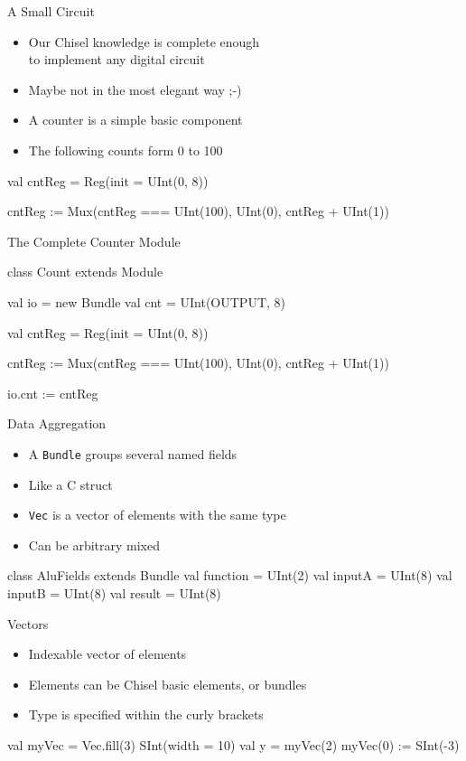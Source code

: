 \documentclass[xcolor=pdflatex,dvipsnames,table]{beamer}
\newcommand{\code}[1]{{\texttt{#1}}}
\begin{document}
\begin{frame}[fragile]{A Small Circuit}
\begin{itemize}
\item Our Chisel knowledge is complete enough\\ to implement any digital circuit
\item Maybe not in the most elegant way ;-)
\item A counter is a simple basic component
\item The following counts form 0 to 100
\end{itemize}
\begin{chisel}
  val cntReg = Reg(init = UInt(0, 8))

  cntReg := Mux(cntReg === UInt(100),
    UInt(0), cntReg + UInt(1))
\end{chisel}
\end{frame}

\begin{frame}[fragile]{The Complete Counter Module}
\begin{chisel}
class Count extends Module {
  val io = new Bundle {
    val cnt = UInt(OUTPUT, 8)
  }

  val cntReg = Reg(init = UInt(0, 8))

  cntReg := Mux(cntReg === UInt(100),
    UInt(0), cntReg + UInt(1))

  io.cnt := cntReg
}
\end{chisel}
\end{frame}

\begin{frame}[fragile]{Data Aggregation}
\begin{itemize}
\item A \code{Bundle} groups several named fields
\item Like a C struct
\item \code{Vec} is a vector of elements with the same type
\item Can be arbitrary mixed
\end{itemize}
\begin{chisel}
class AluFields extends Bundle {
  val function = UInt(2)
  val inputA = UInt(8)
  val inputB = UInt(8)
  val result = UInt(8)
}
\end{chisel}
\end{frame}

\begin{frame}[fragile]{Vectors}
\begin{itemize}
\item Indexable vector of elements
\item Elements can be Chisel basic elements, or bundles
\item Type is specified within the curly brackets
\end{itemize}
\begin{chisel}
val myVec = Vec.fill(3) { SInt(width = 10) }
val y = myVec(2)
myVec(0) := SInt(-3)
\end{chisel}
\end{frame}
\end{document}
